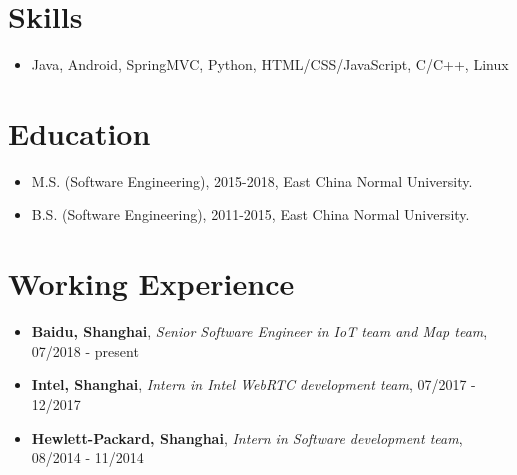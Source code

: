 \documentclass[letterpaper, UTF8]{article}
\begin{document}
	\section*{\textbf{Skills}}\vspace{-0.05in}
	\begin{itemize}
		\item Java, Android, SpringMVC, Python, HTML/CSS/JavaScript, C/C++, Linux
	\end{itemize}
	\vspace{-0.32in}
	
	\section*{\textbf{Education}}\vspace{-0.05in}
	\begin{itemize}
		\item M.S. (Software Engineering), 2015-2018, East China Normal University.
		\item B.S. (Software Engineering), 2011-2015, East China Normal University.
	\end{itemize}	
	\vspace{-0.32in}
	
	\section*{\textbf{Working Experience}}\vspace{-0.05in}
	\begin{itemize}
		\item \textbf{Baidu, Shanghai}, \emph{Senior Software Engineer in IoT team and Map team}, 07/2018 - present
		\item \textbf{Intel, Shanghai}, \emph{Intern in Intel WebRTC development team}, 07/2017 - 12/2017
		\item \textbf{Hewlett-Packard, Shanghai}, \emph{Intern in Software development team}, 08/2014 - 11/2014
	\end{itemize}
	\vspace{-0.32in}
	
\end{document}
